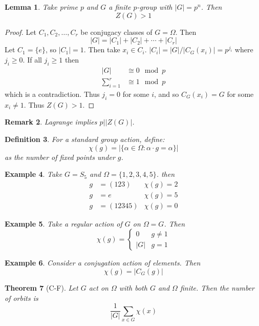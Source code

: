 \documentclass[a4paper,10pt]{article}
\newtheorem{thm}{Theorem}
\newtheorem{Def}[thm]{Definition}
\newtheorem{eg}[thm]{Example}
\newtheorem{Lem}[thm]{Lemma}
\newtheorem{rem}[thm]{Remark}
\begin{document}
\begin{Lem}
Take prime $p$ and $G$ a finite $p$-group with $|G| = p^n$. Then
\[ Z(G) > 1 \]
\end{Lem}

\begin{proof}
Let $C_1, C_2, \dots, C_r$ be conjugacy classes of $G = \Omega$. Then
\[ |G| = |C_1| + |C_2| + \cdots + |C_r| \]
Let $C_1 = \{e\}$, so $|C_1| = 1$. Then take $x_i \in C_i$. $|C_i| = |G| / |C_G(x_i)| = p^{j_i}$ where $j_i \geq 0$. If all $j_i \geq 1$ then
\begin{align*}
|G| &\cong 0 \mod p \\
\sum_{i = 1}^r &\cong 1 \mod p
\end{align*}
which is a contradiction. Thus $j_i = 0$ for some $i$, and so $C_G(x_i) = G$ for some $x_i \neq 1$. Thus $Z(G) > 1$.
\end{proof}

\begin{rem}
Lagrange implies $p \big| |Z(G)|$.
\end{rem}

\begin{Def}
For a standard group action, define:
\[ \chi(g) = | \{ \alpha \in \Omega : \alpha \cdot g = \alpha \} | \]
as the number of fixed points under $g$.
\end{Def}

\begin{eg}
Take $G = S_5$ and $\Omega = \{ 1,2,3,4,5\}$. then
\begin{align*}
g &= (123)             &\chi(g) = 2 \\
g &= e                &\chi(g) = 5 \\
g &= (12345)            &\chi(g) = 0
\end{align*}

\end{eg}




\begin{eg}
Take a regular action of $G$ on $\Omega = G$. Then
\[ \chi(g) = \begin{cases} 0 & g \neq 1 \\ |G| & g = 1 \end{cases} \]
\end{eg}

\begin{eg}
Consider a conjugation action of elements. Then
\[ \chi(g) = |C_G(g)| \]
\end{eg}

\begin{thm}[C-F]
Let $G$ act on $\Omega$ with both $G$ and $\Omega$ finite. Then the number of orbits is
\[ \frac{1}{|G|} \sum_{x \in G} \chi(x) \]
\end{thm}
\end{document}
